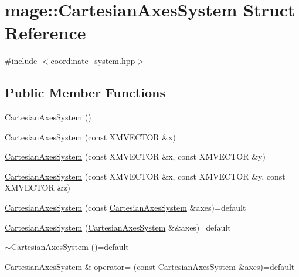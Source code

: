 \hypertarget{structmage_1_1_cartesian_axes_system}{}\section{mage\+:\+:Cartesian\+Axes\+System Struct Reference}
\label{structmage_1_1_cartesian_axes_system}


{\ttfamily \#include $<$coordinate\+\_\+system.\+hpp$>$}

\subsection*{Public Member Functions}
\begin{DoxyCompactItemize}
\item 
\hyperlink{structmage_1_1_cartesian_axes_system_a8f6ebcd50aafda44c478b7aa25e1fd25}{Cartesian\+Axes\+System} ()
\item 
\hyperlink{structmage_1_1_cartesian_axes_system_afd22b658e9221086add8c41958394568}{Cartesian\+Axes\+System} (const X\+M\+V\+E\+C\+T\+OR \&x)
\item 
\hyperlink{structmage_1_1_cartesian_axes_system_a8c5931061f227f6df8eec9ac8b9a7a18}{Cartesian\+Axes\+System} (const X\+M\+V\+E\+C\+T\+OR \&x, const X\+M\+V\+E\+C\+T\+OR \&y)
\item 
\hyperlink{structmage_1_1_cartesian_axes_system_a6d33ce6d7112d0cb63d93693036b986a}{Cartesian\+Axes\+System} (const X\+M\+V\+E\+C\+T\+OR \&x, const X\+M\+V\+E\+C\+T\+OR \&y, const X\+M\+V\+E\+C\+T\+OR \&z)
\item 
\hyperlink{structmage_1_1_cartesian_axes_system_a272ec4e772d87965617ba28957f5a558}{Cartesian\+Axes\+System} (const \hyperlink{structmage_1_1_cartesian_axes_system}{Cartesian\+Axes\+System} \&axes)=default
\item 
\hyperlink{structmage_1_1_cartesian_axes_system_abb84a76b227afbb86f618140a7ae1968}{Cartesian\+Axes\+System} (\hyperlink{structmage_1_1_cartesian_axes_system}{Cartesian\+Axes\+System} \&\&axes)=default
\item 
\hyperlink{structmage_1_1_cartesian_axes_system_a8c32f25e03757c03506d9a93bddf5d13}{$\sim$\+Cartesian\+Axes\+System} ()=default
\item 
\hyperlink{structmage_1_1_cartesian_axes_system}{Cartesian\+Axes\+System} \& \hyperlink{structmage_1_1_cartesian_axes_system_af52da9fbab85fc87921eff0ef6a17fe4}{operator=} (const \hyperlink{structmage_1_1_cartesian_axes_system}{Cartesian\+Axes\+System} \&axes)=default

\end{DoxyCompactItemize}
